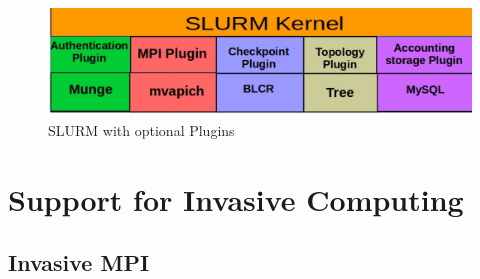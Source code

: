 \begin{figure}[h]
\centering
\includegraphics[width=1.0\textwidth]{./figures/plugin.eps}
\vspace{-0.15in}
\caption{SLURM with optional Plugins}
\label{fig:6}
\end{figure}


\section{Support for Invasive Computing}
\subsection{Invasive MPI}

